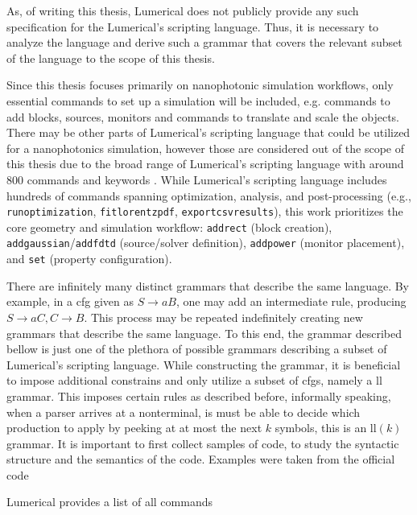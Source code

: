 As, of writing this thesis, Lumerical does not publicly provide any such specification for the Lumerical's scripting language. Thus, it is necessary to analyze the language and derive such a grammar that covers the relevant subset of the language to the scope of this thesis.

Since this thesis focuses primarily on nanophotonic simulation workflows, only essential commands to set up a simulation will be included, e.g. commands to add blocks, sources, monitors and commands to translate and scale the objects. There may be other parts of Lumerical's scripting language that could be utilized for a nanophotonics simulation, however those are considered out of the scope of this thesis due to the broad range of Lumerical's scripting language with around 800 commands and keywords \cite{ansys_lsf_commands}. 
While Lumerical’s scripting language includes hundreds of commands spanning optimization, analysis, and post-processing (e.g., \texttt{runoptimization}, \texttt{fitlorentzpdf}, \texttt{exportcsvresults}), this work prioritizes the core geometry and simulation workflow: \texttt{addrect} (block creation), \texttt{addgaussian}/\texttt{addfdtd} (source/solver definition), \texttt{addpower} (monitor placement), and \texttt{set} (property configuration). 


There are infinitely many distinct grammars that describe the same language. By example, in a \gls{cfg} given as $S \rightarrow aB$, one may add an intermediate rule, producing $S \rightarrow aC, C \rightarrow B$. This process may be repeated indefinitely creating new grammars that describe the same language. To this end, the grammar described bellow is just one of the plethora of possible grammars describing a subset of Lumerical's scripting language. While constructing the grammar, it is beneficial to impose additional constrains and only utilize a subset of \glspl{cfg}, namely a \gls{ll} grammar. This imposes certain rules as described before, informally speaking, when a parser arrives at a nonterminal, is must be able to decide which production to apply by peeking at at most the next $k$ symbols, this is an \gls{ll}$(k)$ grammar.
It is important to first collect samples of code, to study the syntactic structure and the semantics of the code. Examples were taken from the official code 

Lumerical provides a list of all commands \cite{ansys_lsf_commands}



